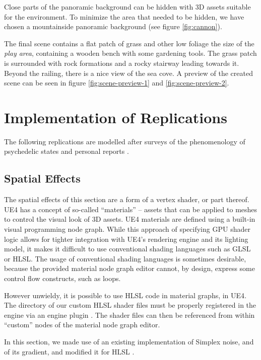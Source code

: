 Close parts of the panoramic background can be hidden with 3D assets suitable for the environment. To minimize the area that needed to be hidden, we have chosen a mountainside panoramic background (see figure \ref{fig:cannon}).

The final scene contains a flat patch of grass and other low foliage the size of the \textit{play area}, containing a wooden bench with some gardening tools. The grass patch is surrounded with rock formations and a rocky stairway leading towards it. Beyond the railing, there is a nice view of the sea cove. A preview of the created scene can be seen in figure \ref{fig:scene-preview-1} and \ref{fig:scene-preview-2}.

\section{Implementation of Replications}\label{sec:implementation}
The following replications are modelled after surveys of the phenomenology of psychedelic states \autocites{preller2016phenomenology}{kometer2016serotonergic} and personal reports \autocite{kleinman1977comparison}.

\subsection{Spatial Effects}
The spatial effects of this section are a form of a vertex shader, or part thereof. \ac{UE4} has a concept of so-called ``materials'' -- assets that can be applied to meshes to control the visual look of 3D assets. \ac{UE4} materials are defined using a built-in visual programming node graph. While this approach of specifying \ac{GPU} shader logic allows for tighter integration with \ac{UE4}'s rendering engine and its lighting model, it makes it difficult to use conventional shading languages such as \ac{GLSL} or \ac{HLSL}. The usage of conventional shading languages is sometimes desirable, because the provided material node graph editor cannot, by design, express some control flow constructs, such as loops.

However unwieldy, it is possible to use \ac{HLSL} code in material graphs, in \ac{UE4}. The directory of our custom \ac{HLSL} shader files must be properly registered in the engine via an engine plugin \autocite{synthenz2021shaderdir}. The shader files can then be referenced from within ``custom'' nodes of the material node graph editor.

In this section, we made use of an existing implementation of Simplex noise, and of its gradient, and modified it for \ac{HLSL} \autocite{ashima2011simplex}.

